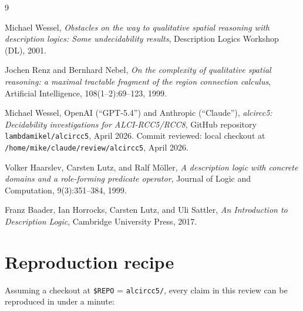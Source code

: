 \documentclass[]{ceurart}
\theoremstyle{definition}
\theoremstyle{remark}
\begin{document}
\begin{thebibliography}{9}

  Michael Wessel,
  \emph{Obstacles on the way to qualitative spatial reasoning with
    description logics: Some undecidability results},
  Description Logics Workshop (DL), 2001.

  Jochen Renz and Bernhard Nebel,
  \emph{On the complexity of qualitative spatial reasoning: a maximal
    tractable fragment of the region connection calculus},
  Artificial Intelligence, 108(1--2):69--123, 1999.

  Michael Wessel, OpenAI (``GPT-5.4'') and Anthropic (``Claude''),
  \emph{alcircc5: Decidability investigations for ALCI-RCC5/RCC8},
  GitHub repository
  \texttt{lambdamikel/alcircc5},
  April 2026.
  Commit reviewed: local checkout at
  \texttt{/home/mike/claude/review/alcircc5}, April 2026.

  Volker Haarslev, Carsten Lutz, and Ralf M\"oller,
  \emph{A description logic with concrete domains and a role-forming
    predicate operator},
  Journal of Logic and Computation, 9(3):351--384, 1999.

  Franz Baader, Ian Horrocks, Carsten Lutz, and Uli Sattler,
  \emph{An Introduction to Description Logic},
  Cambridge University Press, 2017.

\end{thebibliography}

\appendix

\section{Reproduction recipe}
\label{app:repro}

Assuming a checkout at \verb|$REPO| = \verb|alcircc5/|, every claim in
this review can be reproduced in under a minute:
\end{document}
